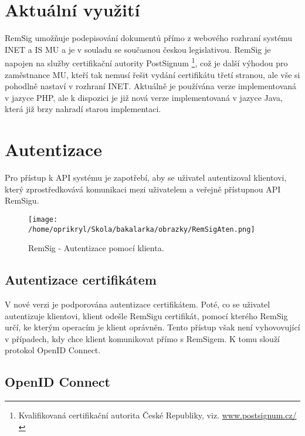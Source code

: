 \documentclass[]{fithesis3}
\begin{document}
	\section{Aktuální využití}

		RemSig umožňuje podepisování dokumentů přímo z webového rozhraní systému INET
		a IS MU a je v souladu se současnou českou legislativou. RemSig je napojen na služby 				certifikační autority PostSignum
	\footnote{Kvalifikovaná certifikační autorita České Republiky, viz. \url{www.postsignum.cz/}}, 			což je další výhodou pro zaměstnance MU, kteří tak nemusí řešit vydání certifikátu třetí 			stranou, ale vše si pohodlně nastaví v rozhraní INET. Aktuálně je používána verze 					implementovaná v jazyce PHP, ale k dispozici je již nová verze implementovaná v jazyce 			Java, která již brzy nahradí starou implementaci. 
	
	\section{Autentizace} 

	Pro přístup k API systému je zapotřebí, aby se uživatel autentizoval klientovi, který 				zprostředkovává komunikaci mezi uživatelem a veřejně přístupnou API RemSigu.  

	\begin{figure}[!ht]
  	\begin{minipage}{1.00\textwidth}
    		\texttt{[image: /home/oprikryl/Skola/bakalarka/obrazky/RemSigAten.png]}
  	\end{minipage}
 	\caption{RemSig - Autentizace pomocí klienta.}
  	\label{fig:RemSig - Autentizace pomocí klienta.}
	\end{figure}

		\subsection{Autentizace certifikátem}

		V nové verzi je podporována autentizace certifikátem. Poté, co se uživatel autentizuje 				klientovi, klient odešle RemSigu certifikát, pomocí kterého RemSig určí, ke kterým 				operacím je klient oprávněn. Tento přístup však není vyhovovující v případech, kdy chce 			klient komunikovat přímo s RemSigem. K tomu slouží protokol OpenID Connect.

		\subsection{OpenID Connect}
\end{document}
